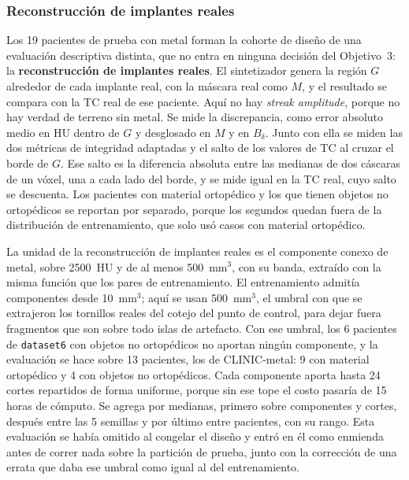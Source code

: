 \subsubsection{Reconstrucción de implantes reales}\label{sec:ap-reconstruccion}

Los 19 pacientes de prueba con metal forman la cohorte de diseño de una evaluación descriptiva distinta, que no entra en ninguna decisión del Objetivo~3: la \textbf{reconstrucción de implantes reales}. El sintetizador genera la región $G$ alrededor de cada implante real, con la máscara real como $M$, y el resultado se compara con la TC real de ese paciente. Aquí no hay \emph{streak amplitude}, porque no hay verdad de terreno sin metal. Se mide la discrepancia, como error absoluto medio en HU dentro de $G$ y desglosado en $M$ y en $B_{\delta}$. Junto con ella se miden las dos métricas de integridad adaptadas y el salto de los valores de TC al cruzar el borde de $G$. Ese salto es la diferencia absoluta entre las medianas de dos cáscaras de un vóxel, una a cada lado del borde, y se mide igual en la TC real, cuyo salto se descuenta. Los pacientes con material ortopédico y los que tienen objetos no ortopédicos se reportan por separado, porque los segundos quedan fuera de la distribución de entrenamiento, que solo usó casos con material ortopédico.

La unidad de la reconstrucción de implantes reales es el componente conexo de metal, sobre 2500~HU y de al menos 500~mm$^3$, con su banda, extraído con la misma función que los pares de entrenamiento. El entrenamiento admitía componentes desde 10~mm$^3$; aquí se usan 500~mm$^3$, el umbral con que se extrajeron los tornillos reales del cotejo del punto de control, para dejar fuera fragmentos que son sobre todo islas de artefacto. Con ese umbral, los 6 pacientes de \texttt{dataset6} con objetos no ortopédicos no aportan ningún componente, y la evaluación se hace sobre 13 pacientes, los de CLINIC-metal: 9 con material ortopédico y 4 con objetos no ortopédicos. Cada componente aporta hasta 24 cortes repartidos de forma uniforme, porque sin ese tope el costo pasaría de 15 horas de cómputo. Se agrega por medianas, primero sobre componentes y cortes, después entre las 5 semillas y por último entre pacientes, con su rango. Esta evaluación se había omitido al congelar el diseño y entró en él como enmienda antes de correr nada sobre la partición de prueba, junto con la corrección de una errata que daba ese umbral como igual al del entrenamiento.

